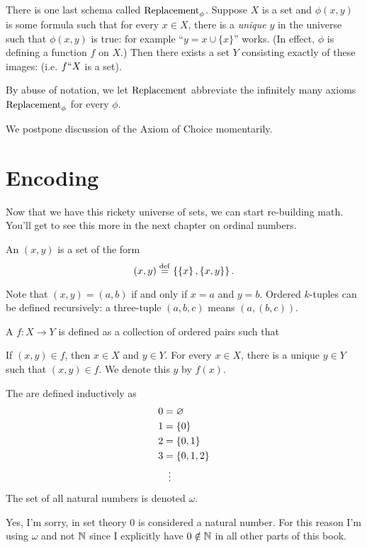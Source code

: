 There is one last schema called $\mathrm{Replacement}_\phi$.
Suppose $X$ is a set and $\phi(x,y)$ is some formula
such that for every $x \in X$, there is a \emph{unique} $y$ in the universe
such that $\phi(x,y)$ is true: for example ``$y = x \cup \{x\}$'' works.
(In effect, $\phi$ is defining a function $f$ on $X$.)
Then there exists a set $Y$ consisting exactly of these images:
(i.e. $f``X$ is a set).
\begin{abuse}
	By abuse of notation, we let $\mathrm{Replacement}$ abbreviate
	the infinitely many axioms $\mathrm{Replacement}_\phi$ for every $\phi$.
\end{abuse}

We postpone discussion of the Axiom of Choice momentarily.

\section{Encoding}
Now that we have this rickety universe of sets, we can start re-building math.
You'll get to see this more in the next chapter on ordinal numbers.

\begin{definition}
	An  $(x,y)$
	is a set of the form
	\[ (x,y) \overset{\mathrm{def}}{=} 
		\left\{ \left\{ x \right\}, \left\{ x,y \right\} \right\}. \]
\end{definition}
Note that $(x,y) = (a,b)$ if and only if $x=a$ and $y=b$.
Ordered $k$-tuples can be defined recursively: a three-tuple $(a,b,c)$ means $(a,(b,c))$.

\begin{definition}
	A  $f : X \to Y$ 
	is defined as a collection of ordered pairs such that
	\begin{itemize}
		\ii If $(x,y) \in f$, then $x \in X$ and $y \in Y$.
		\ii For every $x \in X$, there is a unique $y \in Y$
		such that $(x,y) \in f$. We denote this $y$ by $f(x)$.
	\end{itemize}
\end{definition}

\begin{definition}
	The  are defined inductively as
	\begin{align*}
		0 &= \varnothing \\
		1 &= \{0\} \\
		2 &= \{0,1\} \\
		3 &= \{0,1,2\} \\
		&\vdotswithin=
	\end{align*}
	The set of all natural numbers is denoted $\omega$.
\end{definition}
\begin{abuse}
	Yes, I'm sorry, in set theory $0$ is considered a natural number.
	For this reason I'm using $\omega$ and not $\mathbb N$
	since I explicitly have $0\notin\mathbb N$ in all other parts of this book.
\end{abuse}

